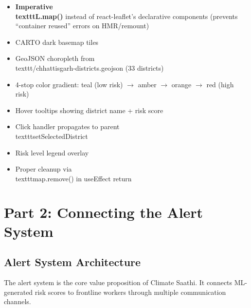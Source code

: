 \documentclass[12pt,a4paper]{report}
\begin{document}
\begin{itemize}[nosep]
  \item \textbf{Imperative \\texttt{L.map()}} instead of react-leaflet's declarative components (prevents ``container reused'' errors on HMR/remount)
  \item CARTO dark basemap tiles
  \item GeoJSON choropleth from \\texttt{/chhattisgarh-districts.geojson} (33 districts)
  \item 4-stop color gradient: teal (low risk) $\rightarrow$ amber $\rightarrow$ orange $\rightarrow$ red (high risk)
  \item Hover tooltips showing district name + risk score
  \item Click handler propagates to parent \\texttt{setSelectedDistrict}
  \item Risk level legend overlay
  \item Proper cleanup via \\texttt{map.remove()} in useEffect return
\end{itemize}

\chapter{Part 2: Connecting the Alert System}

\section{Alert System Architecture}

The alert system is the core value proposition of Climate Saathi. It connects ML-generated risk scores to frontline workers through multiple communication channels.
\end{document}
